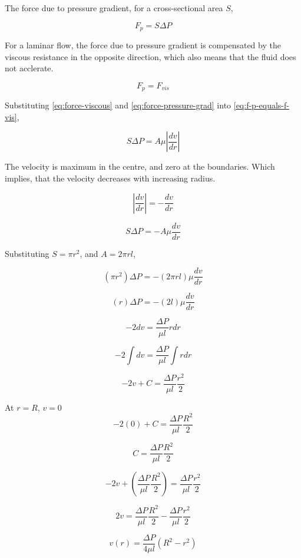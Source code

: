 	The force due to pressure gradient, for a cross-sectional area $S$,
	
	\begin{equation} \label{eq:force-pressure-grad}
		F_{p} = S \Delta P
	\end{equation}
	
	For a laminar flow, the force due to pressure gradient is compensated by the viscous resistance in the opposite direction, which also means that the fluid does not acclerate.
	
	\begin{equation} \label{eq:f-p-equals-f-vis}
		F_{p} = F_{vis}
	\end{equation}
	
	Substituting \ref{eq:force-viscous} and \ref{eq:force-pressure-grad} into \ref{eq:f-p-equals-f-vis},
	
	\[ S \Delta P = A \mu \left| \frac{dv}{dr} \right| \]
	
	The velocity is maximum in the centre, and zero at the boundaries. Which implies, that the velocity decreases with increasing radius.
	
	\[ \left| \frac{dv}{dr} \right| = -\frac{dv}{dr} \]
	
	\[ S \Delta P = -A \mu \frac{dv}{dr} \]
	
	Substituting $S = \pi r^2$, and $A = 2 \pi r l$,
	
	\[ (\pi r^2) \Delta P = -(2 \pi r l) \mu \frac{dv}{dr} \]
	
	\[ (r) \Delta P = -(2 l) \mu \frac{dv}{dr} \]
	
	\[ -2dv = \frac{\Delta P}{\mu l} r dr \]
	
	\[ -2 \int dv = \frac{\Delta P}{\mu l} \int r dr \]
	
	\[ -2v + C = \frac{\Delta P}{\mu l} \frac{r^2}{2} \]
	
	At $r = R$, $v = 0$
	\[ -2(0) + C = \frac{\Delta P}{\mu l} \frac{R^2}{2} \]
	
	\[ C = \frac{\Delta P}{\mu l} \frac{R^2}{2} \]
	
	\[ -2v + \left( \frac{\Delta P}{\mu l} \frac{R^2}{2} \right) = \frac{\Delta P}{\mu l} \frac{r^2}{2} \]
	
	\[2v = \frac{\Delta P}{\mu l} \frac{R^2}{2} - \frac{\Delta P}{\mu l} \frac{r^2}{2} \]
	
	\begin{equation} \label{eq:velocity-dist-pou}
		v(r) = \frac{\Delta P}{4 \mu l} (R^2 - r^2)
	\end{equation}
	
